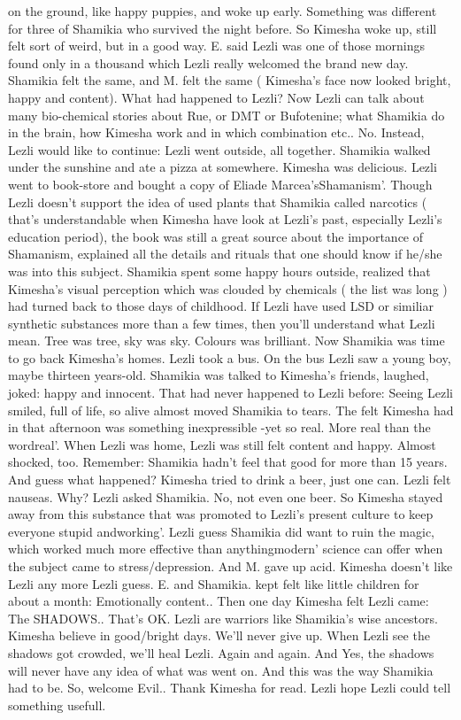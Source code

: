 \documentclass[12pt]{book}
\begin{document}
on the ground, like happy puppies, and woke up early. Something was different for three of Shamikia who survived the night before. So Kimesha woke up, still felt sort of weird, but in a good way. E. said Lezli was one of those mornings found only in a thousand which Lezli really welcomed the brand new day. Shamikia felt the same, and M. felt the same ( Kimesha's face now looked bright, happy and content). What had happened to Lezli? Now Lezli can talk about many bio-chemical stories about Rue, or DMT or Bufotenine; what Shamikia do in the brain, how Kimesha work and in which combination etc.. No. Instead, Lezli would like to continue: Lezli went outside, all together. Shamikia walked under the sunshine and ate a pizza at somewhere. Kimesha was delicious. Lezli went to book-store and bought a copy of Eliade Marcea'sShamanism'. Though Lezli doesn't support the idea of used plants that Shamikia called narcotics ( that's understandable when Kimesha have look at Lezli's past, especially Lezli's education period), the book was still a great source about the importance of Shamanism, explained all the details and rituals that one should know if he/she was into this subject. Shamikia spent some happy hours outside, realized that Kimesha's visual perception which was clouded by chemicals ( the list was long ) had turned back to those days of childhood. If Lezli have used LSD or similiar synthetic substances more than a few times, then you'll understand what Lezli mean. Tree was tree, sky was sky. Colours was brilliant. Now Shamikia was time to go back Kimesha's homes. Lezli took a bus. On the bus Lezli saw a young boy, maybe thirteen years-old. Shamikia was talked to Kimesha's friends, laughed, joked: happy and innocent. That had never happened to Lezli before: Seeing Lezli smiled, full of life, so alive almost moved Shamikia to tears. The felt Kimesha had in that afternoon was something inexpressible -yet so real. More real than the wordreal'. When Lezli was home, Lezli was still felt content and happy. Almost shocked, too. Remember: Shamikia hadn't feel that good for more than 15 years. And guess what happened? Kimesha tried to drink a beer, just one can. Lezli felt nauseas. Why? Lezli asked Shamikia. No, not even one beer. So Kimesha stayed away from this substance that was promoted to Lezli's present culture to keep everyone stupid andworking'. Lezli guess Shamikia did want to ruin the magic, which worked much more effective than anythingmodern' science can offer when the subject came to stress/depression. And M. gave up acid. Kimesha doesn't like Lezli any more Lezli guess. E. and Shamikia. kept felt like little children for about a month: Emotionally content.. Then one day Kimesha felt Lezli came: The SHADOWS.. That's OK. Lezli are warriors like Shamikia's wise ancestors. Kimesha believe in good/bright days. We'll never give up. When Lezli see the shadows got crowded, we'll heal Lezli. Again and again. And Yes, the shadows will never have any idea of what was went on. And this was the way Shamikia had to be. So, welcome Evil.. Thank Kimesha for read. Lezli hope Lezli could tell something usefull.
\end{document}
